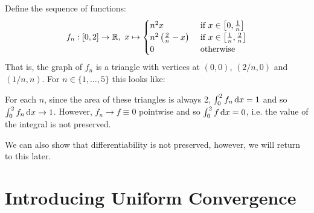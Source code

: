 \documentclass[../main.tex]{subfiles}
\begin{document}
\begin{example} \label{triangleExample}
   Define the sequence of functions:
  \[
    f_n: [0, 2] \to \R,\ x \mapsto \begin{cases}
    n^2 x & \text{ if } x \in \left[0, \frac{1}{n}\right] \\
    n^2\left(\frac{2}{n} - x\right) & \text{ if } x \in \left[\frac{1}{n}, \frac{2}{n}\right] \\
    0 & \text{ otherwise }
    \end{cases}
  \]
  That is, the graph of $f_n$ is a triangle with vertices at $(0, 0)$, $(2/n, 0)$ and $(1/n, n)$.
  For $n \in \{1, \ldots, 5\}$ this looks like:
  \begin{center}
  \end{center}
  For each $n$, since the area of these triangles is always 2, $\int_{0}^{2} f_n \d{x} = 1$ and so $\int_{0}^{2} f_n \d{x} \to 1$.
  However, $f_n \to f \equiv 0$ pointwise and so $\int_{0}^{2} f \d{x} = 0$, i.e. the value of the integral is not preserved.
\end{example}
We can also show that differentiability is not preserved, however, we will return to this later.
\section{Introducing Uniform Convergence}
\end{document}
